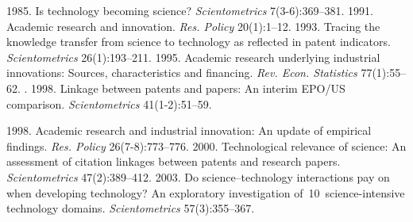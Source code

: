 \begin{multicols}{2}
\vspace*{-6pt}


{\small\frenchspacing
{\baselineskip=10.65pt
\begin{thebibliography}{99}
 1985. Is technology becoming science? 
\textit{Scientometrics} 7(3-6):369--381.
 1991. Academic research and innovation. 
\textit{Res. Policy} 20(1):1--12.
 1993. Tracing the knowledge transfer from science to 
technology as reflected in patent indicators. \textit{Scientometrics} 
26(1):193--211.
 1995. Academic research underlying industrial 
innovations: Sources, characteristics and financing. \textit{Rev. Econ. 
Statistics} 77(1):55--62.
. 1998. Linkage between patents and 
papers: An interim EPO/US comparison. \textit{Scientometrics} 
 41(1-2):51--59.


 1998. Academic research and industrial innovation: An 
update of empirical findings. \textit{Res. Policy} 26(7-8):773--776.
 2000. 
Technological relevance of science: An assessment of citation linkages 
between patents and research papers. \textit{ Scientometrics}  
47(2):389--412.
 2003. Do science--technology interactions pay on when 
developing technology? An exploratory investigation of~10~science-intensive 
technology domains. \textit{Scientometrics} 57(3):355--367.



\end{thebibliography}}}
\end{multicols}
